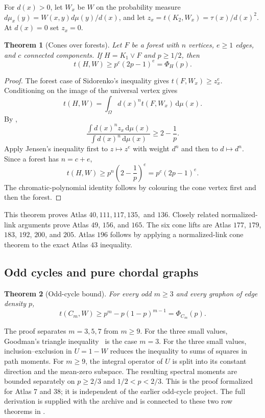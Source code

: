 \documentclass[11pt]{article}
\numberwithin{equation}{section}
\newtheorem{theorem}{Theorem}[section]
\theoremstyle{definition}
\theoremstyle{remark}
\newcommand{\dd}{\,\mathrm d}
\newcommand{\join}{\mathbin{\vee}}
\begin{document}
For $d(x)>0$, let $W_x$ be $W$ on the probability measure
$d\mu_x(y)=W(x,y)d\mu(y)/d(x)$, and let
$z_x=t(K_2,W_x)=\tau(x)/d(x)^2$.  At $d(x)=0$ set $z_x=0$.

\begin{theorem}[Cones over forests]
\label{thm:forest-cone}
Let $F$ be a forest with $n$ vertices, $e\geq1$ edges, and $c$ connected
components.  If $H=K_1\join F$ and $p\geq1/2$, then
\begin{equation}
 t(H,W)\geq p^c(2p-1)^e=\Phi_H(p).
 \label{eq:forest-cone}
\end{equation}
\end{theorem}

\begin{proof}
The forest case of Sidorenko's inequality
\cite[Section~5.2]{Lovasz2012} gives $t(F,W_x)\geq z_x^e$.
Conditioning on the image of the universal vertex gives
\begin{equation}
 t(H,W)=\int_\Omega d(x)^nt(F,W_x)\dd\mu(x).
 \label{eq:cone-link}
\end{equation}
By ,
\[
 \frac{\int d(x)^nz_x\dd\mu(x)}{\int d(x)^n\dd\mu(x)}
 \geq2-\frac1p.
\]
Apply Jensen's inequality first to $z\mapsto z^e$ with weight $d^n$ and
then to $d\mapsto d^n$.  Since a forest has $n=c+e$,
\[
 t(H,W)\geq p^n\left(2-\frac1p\right)^e
 =p^c(2p-1)^e.
\]
The chromatic-polynomial identity follows by colouring the cone vertex first
and then the forest.
\end{proof}

This theorem proves Atlas $40,111,117,135,$ and $136$.  Closely related
normalized-link arguments prove Atlas $49$, $156$, and $165$.  The six cone
lifts are Atlas $177$, $179$, $183$, $192$, $200$, and $205$.  Atlas $196$
follows by applying a
normalized-link cone theorem to the exact Atlas $43$ inequality.

\subsection{Odd cycles and pure chordal graphs}

\begin{theorem}[Odd-cycle bound]
\label{thm:odd-cycle}
For every odd $m\geq3$ and every graphon of edge density $p$,
\begin{equation}
 t(C_m,W)\geq p^m-p(1-p)^{m-1}=\Phi_{C_m}(p).
 \label{eq:odd-cycle}
\end{equation}
\end{theorem}

The proof separates $m=3,5,7$ from $m\geq9$.  For the three small values,
Goodman's triangle inequality~\cite{Goodman1959} is the case $m=3$.
For the three small values, inclusion--exclusion in $U=1-W$ reduces the inequality to sums of squares in
path moments.  For $m\geq9$, the integral operator of $U$ is split into its
constant direction and the mean-zero subspace.  The resulting spectral
moments are bounded separately on $p\geq2/3$ and $1/2<p<2/3$.  This is the
proof formalized for Atlas $7$ and $38$; it is independent of the earlier
odd-cycle project.  The full derivation is supplied with the archive and is
connected to these two row theorems in .
\end{document}
